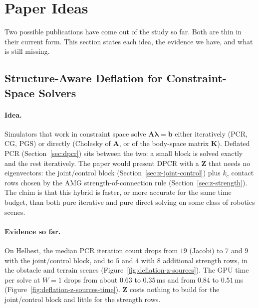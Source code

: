 \section{Paper Ideas}
\label{sec:paper-ideas}

Two possible publications have come out of the study so far. Both are
thin in their current form. This section states each idea, the evidence
we have, and what is still missing.

\subsection{Structure-Aware Deflation for Constraint-Space Solvers}
\label{sec:idea-deflation}

\paragraph{Idea.}
Simulators that work in constraint space solve
$\mathbf{A}\boldsymbol{\lambda} = \mathbf{b}$ either iteratively (PCR, CG,
PGS) or directly (Cholesky of $\mathbf{A}$, or of the body-space matrix
$\mathbf{K}$). Deflated PCR (Section~\ref{sec:dpcr}) sits between the two:
a small block is solved exactly and the rest iteratively. The paper would
present DPCR with a $\mathbf{Z}$ that needs no eigenvectors: the
joint/control block (Section~\ref{sec:z-joint-control}) plus $k_c$
contact rows chosen by the AMG strength-of-connection rule
(Section~\ref{sec:z-strength}). The claim is that this hybrid is faster,
or more accurate for the same time budget, than both pure iterative and
pure direct solving on some class of robotics scenes.

\paragraph{Evidence so far.}
On Helhest, the median PCR iteration count drops from $19$ (Jacobi) to
$7$ and $9$ with the joint/control block, and to $5$ and $4$ with $8$
additional strength rows, in the obstacle and terrain scenes
(Figure~\ref{fig:deflation-z-sources}). The GPU time per solve at $W = 1$
drops from about $0.63$ to $0.35$\,ms and from $0.84$ to $0.51$\,ms
(Figure~\ref{fig:deflation-z-sources-time}). $\mathbf{Z}$ costs nothing to
build for the joint/control block and little for the strength rows.

